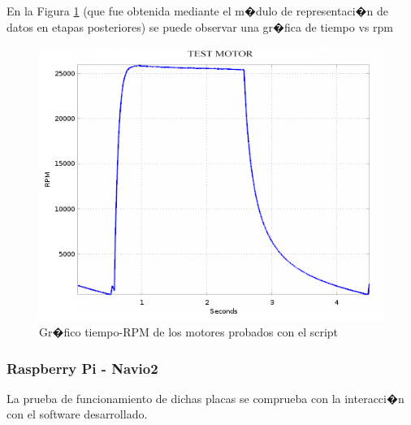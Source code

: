 En la Figura \ref{fig:motortest} (que fue obtenida mediante el m�dulo de representaci�n de datos en etapas posteriores) se puede observar una gr�fica de tiempo vs rpm

\begin{figure}[h!]
	\centering
	\includegraphics[width=0.7\linewidth, height=0.2\textheight]{Imagenes/motor_test}
	\caption{Gr�fico tiempo-RPM de los motores probados con el script}
	\label{fig:motortest}
\end{figure}




\subsubsection{Raspberry Pi - Navio2}

La prueba de funcionamiento de dichas placas se comprueba con la interacci�n con el software desarrollado. 

